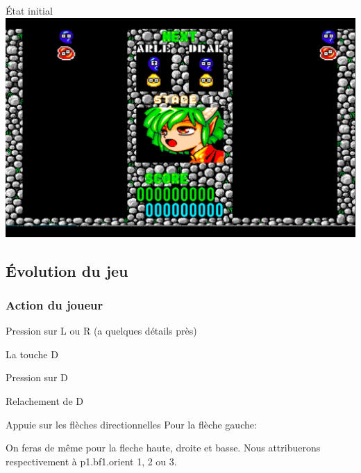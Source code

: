 \documentclass[10pt,dvipsnames,final]{beamer}
\begin{document}
\begin{frame}{État initial}
\includegraphics[width=\textwidth]{presentationfiles/Capture_decran_2021-03-21_a_21.51.47} 
\end{frame}

\subsection{Évolution du jeu}

\subsubsection{Action du joueur}

\begin{frame}{Pression sur L ou R (a quelques détails près)}

\end{frame}

\begin{frame}{La touche D}
\begin{block}{Pression sur D}

\end{block}
\begin{block}{Relachement de D}

\end{block}
\end{frame}

\begin{frame}{Appuie sur les flèches directionnelles}
Pour la flèche gauche:

On feras de même pour la fleche haute, droite et basse. Nous attribuerons respectivement à p1.bf1.orient 1, 2 ou 3.
\end{frame}
\end{document}
